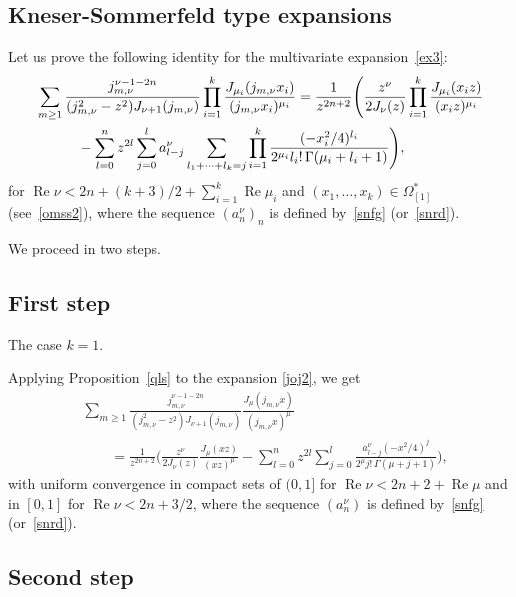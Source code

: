 \documentclass[12pt,leqno]{amsart}
\numberwithin{equation}{section}
\theoremstyle{plain}
\renewcommand{\Re}{\operatorname{Re}}
\begin{document}
\subsection{Kneser-Sommerfeld type expansions}
\label{sec:KnSom}

Let us prove the following identity for the multivariate expansion~\eqref{ex3}:
\begin{align}
\label{iec8}
& \sum_{m\ge 1} \frac{j_{m,\nu}^{\nu-1-2n}}{(j_{m,\nu}^{2}-z^2)J_{\nu+1}(j_{m,\nu})}
\prod_{i=1}^k \frac{J_{\mu_i}(j_{m,\nu}x_i)}
  {(j_{m,\nu}x_i)^{\mu_i}} = \frac{1}{z^{2n+2}}
  \Bigg( \frac{z^{\nu}}{2J_\nu(z)}\prod_{i=1}^k\frac{J_{\mu_i}(x_i z)}{(x_i z)^{\mu_i}} \\
  \nonumber
&\qquad\quad \null- \sum_{l=0}^nz^{2l} \sum_{j=0}^l
a_{l-j}^\nu \sum_{l_1+\cdots+l_k=j}
\prod_{i=1}^k\frac{(-x_i^2/4)^{l_i}}
   {2^{\mu_i }l_i!\, \Gamma(\mu_i + l_i+1)} \Bigg),
\end{align}
for $\Re \nu<2n+(k+3)/2+ \sum_{i=1}^k\Re \mu_i$ and $(x_1,\dots, x_k)\in \Omega_{[1]}^*$ (see~\eqref{omss2}), where the sequence $(a_n^{\nu})_n$ is defined by~\eqref{snfg} (or~\eqref{snrd}).

We proceed in two steps.

\subsection{First step} 

The case $k=1$. 

Applying Proposition~\ref{qls} to the expansion \eqref{joj2}, we get
\begin{align}
\label{jojp}
&\sum_{m\ge 1} \frac{j_{m,\nu}^{\nu-1-2n}}{(j_{m,\nu}^{2}-z^2)J_{\nu+1}(j_{m,\nu})}
  \frac{J_{\mu}(j_{m,\nu}x)}{(j_{m,\nu}x)^{\mu}} \\
\nonumber 
&\qquad = \frac{1}{z^{2n+2}} \bigg( \frac{z^\nu}{2J_\nu(z)} \frac{J_{\mu}(xz)}{(xz)^\mu}
- \sum_{l=0}^nz^{2l} \sum_{j=0}^l
\frac{a_{l-j}^\nu (-x^2/4)^{j}}{2^{\mu}j!\, \Gamma(\mu+j+1)} \bigg),
\end{align}
with uniform convergence in compact sets of $(0,1]$ for $\Re\nu<2n+2+\Re \mu$ and in $[0,1]$ for $\Re\nu<2n+3/2$, where the sequence $(a_n^\nu)$ is defined by~\eqref{snfg} (or~\eqref{snrd}).

\subsection{Second step} 
\end{document}
